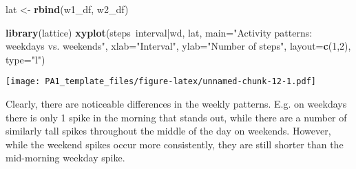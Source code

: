 \documentclass[]{article}
\newenvironment{Shaded}{\begin{snugshade}}{\end{snugshade}}
\newcommand{\KeywordTok}[1]{\textcolor[rgb]{0.13,0.29,0.53}{\textbf{{#1}}}}
\newcommand{\DataTypeTok}[1]{\textcolor[rgb]{0.13,0.29,0.53}{{#1}}}
\newcommand{\DecValTok}[1]{\textcolor[rgb]{0.00,0.00,0.81}{{#1}}}
\newcommand{\StringTok}[1]{\textcolor[rgb]{0.31,0.60,0.02}{{#1}}}
\newcommand{\NormalTok}[1]{{#1}}
\begin{document}
\begin{Shaded}
\begin{Highlighting}[]
\NormalTok{lat <-}\StringTok{ }\KeywordTok{rbind}\NormalTok{(w1_df, w2_df)}

\KeywordTok{library}\NormalTok{(lattice)}
\KeywordTok{xyplot}\NormalTok{(steps~interval|wd, lat,}
       \DataTypeTok{main=}\StringTok{"Activity patterns: weekdays vs. weekends"}\NormalTok{,}
       \DataTypeTok{xlab=}\StringTok{"Interval"}\NormalTok{, }\DataTypeTok{ylab=}\StringTok{"Number of steps"}\NormalTok{,}
       \DataTypeTok{layout=}\KeywordTok{c}\NormalTok{(}\DecValTok{1}\NormalTok{,}\DecValTok{2}\NormalTok{), }\DataTypeTok{type=}\StringTok{"l"}\NormalTok{)}
\end{Highlighting}
\end{Shaded}

\texttt{[image: PA1\_template\_files/figure-latex/unnamed-chunk-12-1.pdf]}

Clearly, there are noticeable differences in the weekly patterns. E.g.
on weekdays there is only 1 spike in the morning that stands out, while
there are a number of similarly tall spikes throughout the middle of the
day on weekends. However, while the weekend spikes occur more
consistently, they are still shorter than the mid-morning weekday spike.
\end{document}

